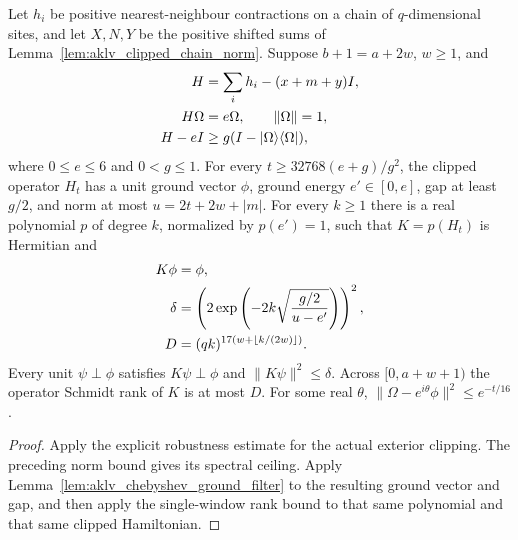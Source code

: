 \begin{lemma}
    \label{thm:aklv_normalized_chain_chebyshev}
    \leanok
    Let $h_i$ be positive nearest-neighbour contractions on a chain of
    $q$-dimensional sites, and let $X,N,Y$ be the positive shifted sums
    of Lemma~\ref{lem:aklv_clipped_chain_norm}.
    Suppose $b+1=a+2w$, $w\ge1$, and
    \begin{align}
        H       & =\sum_i h_i-(x+m+y)I,\notag                  \\
        H\Omega & =e\Omega,\qquad \|\Omega\|=1,\notag          \\
        H-eI    & \ge g(I-|\Omega\rangle\langle\Omega|),\notag
    \end{align}
    where $0\le e\le6$ and $0<g\le1$.
    For every $t\ge32768(e+g)/g^2$, the clipped operator $H_t$ has
    a unit ground vector $\phi$, ground energy $e'\in[0,e]$, gap at
    least $g/2$, and norm at most $u=2t+2w+|m|$.
    For every $k\ge1$ there is a real polynomial $p$ of degree $k$,
    normalized by $p(e')=1$, such that $K=p(H_t)$ is Hermitian and
    \begin{align}
        K\phi  & =\phi,\notag                                                        \\
        \delta & =\left(2\exp\left(-2k\sqrt{\frac{g/2}{u-e'}}\right)\right)^2,\notag \\
        D      & =(qk)^{17(w+\lfloor k/(2w)\rfloor)}.\notag
    \end{align}
    Every unit $\psi\perp\phi$ satisfies
    $K\psi\perp\phi$ and $\|K\psi\|^2\le\delta$.
    Across $[0,a+w+1)$ the operator Schmidt rank of $K$ is at most $D$.
    For some real $\theta$,
    $\|\Omega-e^{i\theta}\phi\|^2\le e^{-t/16}$.
\end{lemma}
\begin{proof}\leanok
    Apply the explicit robustness estimate for the actual exterior clipping.
    The preceding norm bound gives its spectral ceiling.
    Apply Lemma~\ref{lem:aklv_chebyshev_ground_filter} to the resulting
    ground vector and gap, and then apply the single-window rank bound
    to that same polynomial and that same clipped Hamiltonian.
\end{proof}

